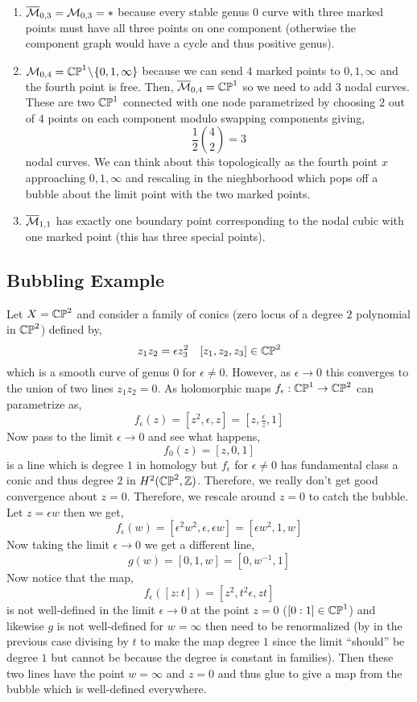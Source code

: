 \documentclass[12pt]{article}
\begin{document}
\begin{example}
\begin{enumerate}
\item $\overline{\mathcal{M}}_{0,3} = \mathcal{M}_{0,3} = *$ because every stable genus $0$ curve with three marked points must have all three points on one component (otherwise the component graph would have a cycle and thus positive genus). 

\item $\mathcal{M}_{0,4} = \mathbb{CP}^1 \! \setminus \! \{ 0, 1, \infty \}$ because we can send $4$ marked points to $0,1,\infty$ and the fourth point is free. Then, $\overline{\mathcal{M}}_{0,4} = \mathbb{CP}^1$ so we need to add $3$ nodal curves. These are two $\mathbb{CP}^1$ connected with one node parametrized by choosing $2$ out of $4$ points on each component modulo swapping components giving,
\[ \frac{1}{2} { 4 \choose 2 } = 3 \]
nodal curves. We can think about this topologically as the fourth point $x$ approaching $0,1,\infty$ and rescaling in the nieghborhood which pops off a bubble about the limit point with the two marked points. 

\item $\overline{\mathcal{M}}_{1,1}$ has exactly one boundary point corresponding to the nodal cubic with one marked point (this has three special points). 
\end{enumerate}
\end{example}

\subsection{Bubbling Example}

Let $X = \mathbb{CP}^2$ and consider a family of conics (zero locus of a degree $2$ polynomial in $\mathbb{CP}^2$) defined by,
\[ z_1 z_2 = \epsilon z_3^2 \quad [z_1, z_2, z_3] \in \mathbb{CP}^2 \]
which is a smooth curve of genus $0$ for $\epsilon \neq 0$. However, as $\epsilon \to 0$ this converges to the union of two lines $z_1 z_2 = 0$. As holomorphic maps $f_\epsilon : \mathbb{CP}^1 \to \mathbb{CP}^2$ can parametrize as,
\[ f_\epsilon(z) = [z^2, \epsilon, z] = [z, \tfrac{\epsilon}{z}, 1] \]
Now pass to the limit $\epsilon \to 0$ and see what happens,
\[ f_0(z) = [z,0,1] \]
is a line which is degree $1$ in homology but $f_\epsilon$ for $\epsilon \neq 0$ has fundamental class a conic and thus degree $2$ in $H^2(\mathbb{CP}^2, \mathbb{Z})$. Therefore, we really don't get good convergence about $z = 0$. Therefore, we rescale around $z = 0$ to catch the bubble. Let $z = \epsilon w$ then we get,
\[ f_\epsilon(w) = [\epsilon^2 w^2, \epsilon, \epsilon w] = [\epsilon w^2, 1, w]  \]
Now taking the limit $\epsilon \to 0$ we get a different line,
\[ g(w) = [0,1,w] = [0, w^{-1}, 1] \]
Now notice that the map,
\[ f_\epsilon([z : t]) = [z^2, t^2 \epsilon, z t] \]
is not well-defined in the limit $\epsilon \to 0$ at the point $z = 0$ ($[0:1] \in \mathbb{CP}^1$) and likewise $g$ is not well-defined for $w = \infty$ then need to be renormalized (by in the previous case divising by $t$ to make the map degree $1$ since the limit ``should'' be degree $1$ but cannot be because the degree is constant in families). 
Then these two lines have the point $w = \infty$ and $z = 0$ and thus glue to give a map from the bubble which is well-defined everywhere.
\end{document}
